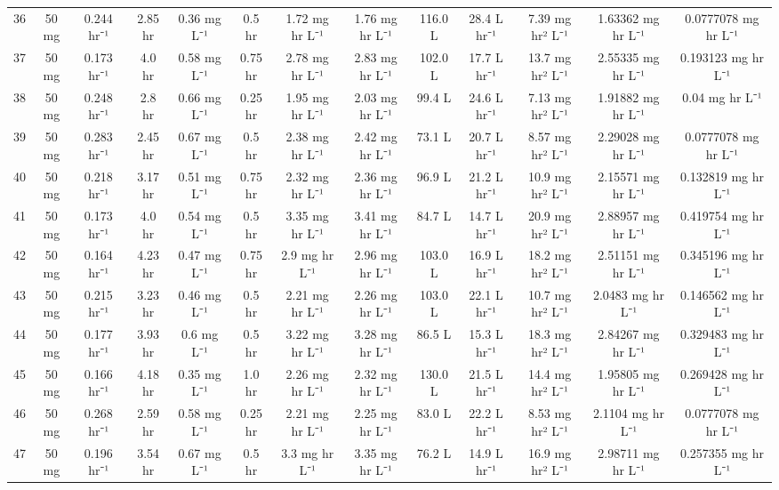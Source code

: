 \documentclass[12pt,a4paper]{article}
\begin{document}
\begin{tabular}{r|cccccccccccc}
	36 & 50 mg & 0.244 hr⁻¹ & 2.85 hr & 0.36 mg L⁻¹ & 0.5 hr & 1.72 mg hr L⁻¹ & 1.76 mg hr L⁻¹ & 116.0 L & 28.4 L hr⁻¹ & 7.39 mg hr² L⁻¹ & 1.63362 mg hr L⁻¹ & 0.0777078 mg hr L⁻¹ \\
	37 & 50 mg & 0.173 hr⁻¹ & 4.0 hr & 0.58 mg L⁻¹ & 0.75 hr & 2.78 mg hr L⁻¹ & 2.83 mg hr L⁻¹ & 102.0 L & 17.7 L hr⁻¹ & 13.7 mg hr² L⁻¹ & 2.55335 mg hr L⁻¹ & 0.193123 mg hr L⁻¹ \\
	38 & 50 mg & 0.248 hr⁻¹ & 2.8 hr & 0.66 mg L⁻¹ & 0.25 hr & 1.95 mg hr L⁻¹ & 2.03 mg hr L⁻¹ & 99.4 L & 24.6 L hr⁻¹ & 7.13 mg hr² L⁻¹ & 1.91882 mg hr L⁻¹ & 0.04 mg hr L⁻¹ \\
	39 & 50 mg & 0.283 hr⁻¹ & 2.45 hr & 0.67 mg L⁻¹ & 0.5 hr & 2.38 mg hr L⁻¹ & 2.42 mg hr L⁻¹ & 73.1 L & 20.7 L hr⁻¹ & 8.57 mg hr² L⁻¹ & 2.29028 mg hr L⁻¹ & 0.0777078 mg hr L⁻¹ \\
	40 & 50 mg & 0.218 hr⁻¹ & 3.17 hr & 0.51 mg L⁻¹ & 0.75 hr & 2.32 mg hr L⁻¹ & 2.36 mg hr L⁻¹ & 96.9 L & 21.2 L hr⁻¹ & 10.9 mg hr² L⁻¹ & 2.15571 mg hr L⁻¹ & 0.132819 mg hr L⁻¹ \\
	41 & 50 mg & 0.173 hr⁻¹ & 4.0 hr & 0.54 mg L⁻¹ & 0.5 hr & 3.35 mg hr L⁻¹ & 3.41 mg hr L⁻¹ & 84.7 L & 14.7 L hr⁻¹ & 20.9 mg hr² L⁻¹ & 2.88957 mg hr L⁻¹ & 0.419754 mg hr L⁻¹ \\
	42 & 50 mg & 0.164 hr⁻¹ & 4.23 hr & 0.47 mg L⁻¹ & 0.75 hr & 2.9 mg hr L⁻¹ & 2.96 mg hr L⁻¹ & 103.0 L & 16.9 L hr⁻¹ & 18.2 mg hr² L⁻¹ & 2.51151 mg hr L⁻¹ & 0.345196 mg hr L⁻¹ \\
	43 & 50 mg & 0.215 hr⁻¹ & 3.23 hr & 0.46 mg L⁻¹ & 0.5 hr & 2.21 mg hr L⁻¹ & 2.26 mg hr L⁻¹ & 103.0 L & 22.1 L hr⁻¹ & 10.7 mg hr² L⁻¹ & 2.0483 mg hr L⁻¹ & 0.146562 mg hr L⁻¹ \\
	44 & 50 mg & 0.177 hr⁻¹ & 3.93 hr & 0.6 mg L⁻¹ & 0.5 hr & 3.22 mg hr L⁻¹ & 3.28 mg hr L⁻¹ & 86.5 L & 15.3 L hr⁻¹ & 18.3 mg hr² L⁻¹ & 2.84267 mg hr L⁻¹ & 0.329483 mg hr L⁻¹ \\
	45 & 50 mg & 0.166 hr⁻¹ & 4.18 hr & 0.35 mg L⁻¹ & 1.0 hr & 2.26 mg hr L⁻¹ & 2.32 mg hr L⁻¹ & 130.0 L & 21.5 L hr⁻¹ & 14.4 mg hr² L⁻¹ & 1.95805 mg hr L⁻¹ & 0.269428 mg hr L⁻¹ \\
	46 & 50 mg & 0.268 hr⁻¹ & 2.59 hr & 0.58 mg L⁻¹ & 0.25 hr & 2.21 mg hr L⁻¹ & 2.25 mg hr L⁻¹ & 83.0 L & 22.2 L hr⁻¹ & 8.53 mg hr² L⁻¹ & 2.1104 mg hr L⁻¹ & 0.0777078 mg hr L⁻¹ \\
	47 & 50 mg & 0.196 hr⁻¹ & 3.54 hr & 0.67 mg L⁻¹ & 0.5 hr & 3.3 mg hr L⁻¹ & 3.35 mg hr L⁻¹ & 76.2 L & 14.9 L hr⁻¹ & 16.9 mg hr² L⁻¹ & 2.98711 mg hr L⁻¹ & 0.257355 mg hr L⁻¹ \\

\end{tabular}
\end{document}
